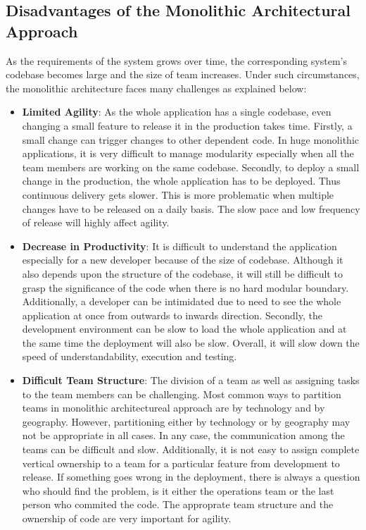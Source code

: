\subsection{Disadvantages of the Monolithic Architectural Approach}\label{subsection:context/monolith-disadvantages}
As the requirements of the system grows over time, the corresponding system's codebase becomes large and the size of team increases. Under such circumstances, the monolithic architecture faces many challenges as explained below:
\\
\cite{Namiot:2014aa}\cite{Newman:2015aa}\cite{Abram:2014aa}\cite{Richardson:2014aa}\cite{Richardson:2014ab}\cite{Gupta:2015aa}
\begin{itemize}[leftmargin=.5in]
\item \textbf{Limited Agility}: As the whole application has a single codebase, even changing a small feature to release it in the production takes time. Firstly, a small change can trigger changes to other dependent code. In huge monolithic applications, it is very difficult to manage modularity especially when all the team members are working on the same codebase. Secondly, to deploy a small change in the production, the whole application has to be deployed. Thus continuous delivery gets slower. This is more problematic when multiple changes have to be released on a daily basis. The slow pace and low frequency of release will highly affect agility.
\\
\item \textbf{Decrease in Productivity}: It is difficult to understand the application especially for a new developer because of the size of codebase. Although it also depends upon the structure of the codebase, it will still be difficult to grasp the significance of the code when there is no hard modular boundary. Additionally, a developer can be intimidated due to need to see the whole application at once from outwards to inwards direction. Secondly, the development environment can be slow to load the whole application and at the same time the deployment will also be slow. Overall, it will slow down the speed of understandability, execution and testing.
\\
\item \textbf{Difficult Team Structure}: The division of a team as well as assigning tasks to the team members can be challenging. Most common ways to partition teams in monolithic architectureal approach are by technology and by geography. However, partitioning either by technology or by geography may not be appropriate in all cases. In any case, the communication among the teams can be difficult and slow. Additionally, it is not easy to assign complete vertical ownership to a team for a particular feature from development to release. If something goes wrong in the deployment, there is always a question who should find the problem, is it either the operations team or the last person who commited the code. The approprate team structure and the ownership of code are very important for agility.

\end{itemize}
